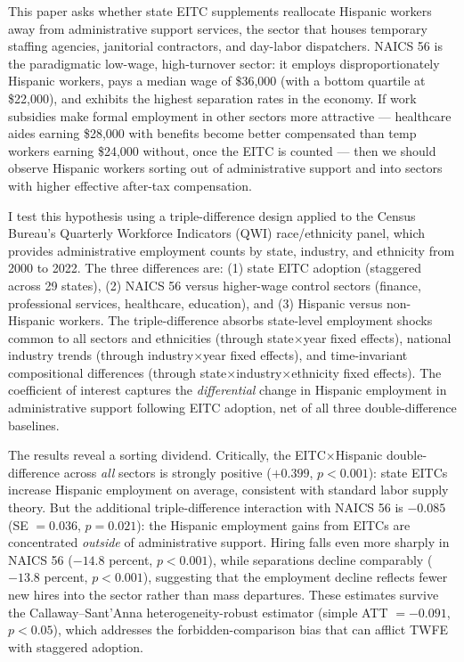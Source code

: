 \documentclass[12pt]{article}
\begin{document}
This paper asks whether state EITC supplements reallocate Hispanic workers away from administrative support services, the sector that houses temporary staffing agencies, janitorial contractors, and day-labor dispatchers. NAICS 56 is the paradigmatic low-wage, high-turnover sector: it employs disproportionately Hispanic workers, pays a median wage of \$36{,}000 (with a bottom quartile at \$22{,}000), and exhibits the highest separation rates in the economy. If work subsidies make formal employment in other sectors more attractive --- healthcare aides earning \$28{,}000 with benefits become better compensated than temp workers earning \$24{,}000 without, once the EITC is counted --- then we should observe Hispanic workers sorting out of administrative support and into sectors with higher effective after-tax compensation.

I test this hypothesis using a triple-difference design applied to the Census Bureau's Quarterly Workforce Indicators (QWI) race/ethnicity panel, which provides administrative employment counts by state, industry, and ethnicity from 2000 to 2022. The three differences are: (1) state EITC adoption (staggered across 29 states), (2) NAICS 56 versus higher-wage control sectors (finance, professional services, healthcare, education), and (3) Hispanic versus non-Hispanic workers. The triple-difference absorbs state-level employment shocks common to all sectors and ethnicities (through state$\times$year fixed effects), national industry trends (through industry$\times$year fixed effects), and time-invariant compositional differences (through state$\times$industry$\times$ethnicity fixed effects). The coefficient of interest captures the \textit{differential} change in Hispanic employment in administrative support following EITC adoption, net of all three double-difference baselines.

The results reveal a sorting dividend. Critically, the EITC$\times$Hispanic double-difference across \textit{all} sectors is strongly positive ($+0.399$, $p < 0.001$): state EITCs increase Hispanic employment on average, consistent with standard labor supply theory. But the additional triple-difference interaction with NAICS 56 is $-0.085$ (SE $= 0.036$, $p = 0.021$): the Hispanic employment gains from EITCs are concentrated \textit{outside} of administrative support. Hiring falls even more sharply in NAICS 56 ($-14.8$ percent, $p < 0.001$), while separations decline comparably ($-13.8$ percent, $p < 0.001$), suggesting that the employment decline reflects fewer new hires into the sector rather than mass departures. These estimates survive the Callaway--Sant'Anna \citeyearpar{callaway2021difference} heterogeneity-robust estimator (simple ATT $= -0.091$, $p < 0.05$), which addresses the forbidden-comparison bias that can afflict TWFE with staggered adoption.
\end{document}
